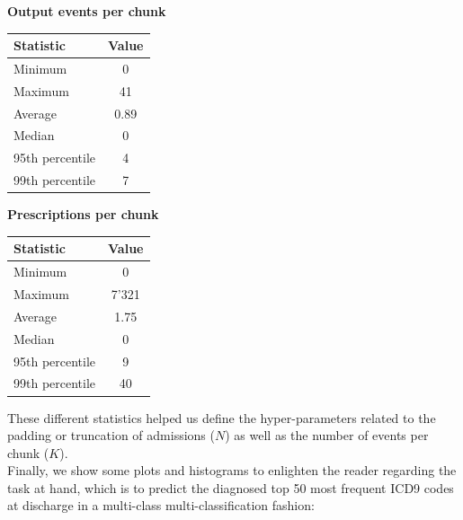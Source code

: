 \begin{multicols}{2}
 \centering
 \textbf{Output events per chunk}
 \begin{center}
  \begin{tabular}{| l | c |}
   \hline
   \textbf{Statistic} & \textbf{Value} \\ \hline
   Minimum & 0 \\ \hline
   Maximum & 41 \\ \hline
   Average & 0.89 \\ \hline
   Median & 0 \\ \hline
   95th percentile & 4 \\ \hline
   99th percentile & 7 \\
   \hline
  \end{tabular}
 \end{center}\columnbreak
 \textbf{Prescriptions per chunk}
 \begin{center}
  \begin{tabular}{| l | c |}
   \hline
   \textbf{Statistic} & \textbf{Value} \\ \hline
   Minimum & 0 \\ \hline
   Maximum & 7'321 \\ \hline
   Average & 1.75 \\ \hline
   Median & 0 \\ \hline
   95th percentile & 9 \\ \hline
   99th percentile & 40 \\
   \hline
  \end{tabular}
 \end{center}
\end{multicols}

These different statistics helped us define the hyper-parameters related to the padding or truncation of admissions ($N$) as well as the number of events per chunk ($K$). \\

Finally, we show some plots and histograms to enlighten the reader regarding the task at hand, which is to predict the diagnosed top 50 most frequent ICD9 codes at discharge in a multi-class multi-classification fashion:


